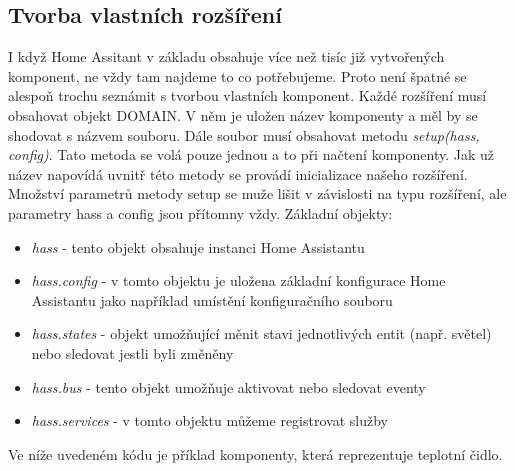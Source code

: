 \documentclass[a4paper,12pt,czech,bibliography=totoc]{scrbook}
\begin{document}
	\subsection{Tvorba vlastních rozšíření}	
		I když Home Assitant v základu obsahuje více než tisíc již vytvořených komponent, ne vždy tam najdeme to co potřebujeme. Proto není špatné se alespoň trochu seznámit s tvorbou vlastních komponent.  Každé rozšíření musí obsahovat objekt DOMAIN. V něm je uložen název komponenty a měl by se shodovat s názvem souboru. Dále soubor musí obsahovat metodu \textit{setup(hass, config)}. Tato metoda se volá pouze jednou a to při načtení komponenty. Jak už název napovídá uvnitř této metody se provádí inicializace našeho rozšíření. Množství parametrů metody setup se muže lišit v závislosti na typu rozšíření, ale parametry hass a config jsou přítomny vždy.
		\newline
		Základní objekty:
		\begin{itemize}
			\item \textit{hass} - tento objekt obsahuje instanci Home Assistantu
			\item \textit{hass.config} - v tomto objektu je uložena základní konfigurace Home Assistantu jako například umístění konfiguračního souboru
			\item \textit{hass.states} - objekt umožňující měnit stavi jednotlivých entit (např. světel) nebo sledovat jestli byli změněny
			\item \textit{hass.bus} - tento objekt umožňuje aktivovat nebo sledovat eventy
			\item \textit{hass.services} - v tomto objektu můžeme registrovat služby
		\end{itemize}
Ve níže uvedeném kódu je příklad komponenty, která reprezentuje teplotní čidlo.
\end{document}
